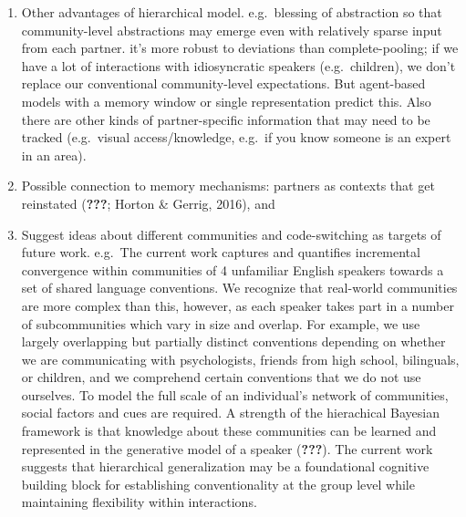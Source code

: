 \documentclass[10pt, letterpaper]{article}
\begin{document}
\begin{enumerate}
\def\labelenumi{\arabic{enumi}.}
\item
  Other advantages of hierarchical model. e.g.~blessing of abstraction
  so that community-level abstractions may emerge even with relatively
  sparse input from each partner. it's more robust to deviations than
  complete-pooling; if we have a lot of interactions with idiosyncratic
  speakers (e.g.~children), we don't replace our conventional
  community-level expectations. But agent-based models with a memory
  window or single representation predict this. Also there are other
  kinds of partner-specific information that may need to be tracked
  (e.g.~visual access/knowledge, e.g.~if you know someone is an expert
  in an area).
\item
  Possible connection to memory mechanisms: partners as contexts that
  get reinstated ({\textbf{???}}; Horton \& Gerrig, 2016), and
\item
  Suggest ideas about different communities and code-switching as
  targets of future work. e.g.~The current work captures and quantifies
  incremental convergence within communities of 4 unfamiliar English
  speakers towards a set of shared language conventions. We recognize
  that real-world communities are more complex than this, however, as
  each speaker takes part in a number of subcommunities which vary in
  size and overlap. For example, we use largely overlapping but
  partially distinct conventions depending on whether we are
  communicating with psychologists, friends from high school,
  bilinguals, or children, and we comprehend certain conventions that we
  do not use ourselves. To model the full scale of an individual's
  network of communities, social factors and cues are required. A
  strength of the hierachical Bayesian framework is that knowledge about
  these communities can be learned and represented in the generative
  model of a speaker ({\textbf{???}}). The current work suggests that
  hierarchical generalization may be a foundational cognitive building
  block for establishing conventionality at the group level while
  maintaining flexibility within interactions.
\end{enumerate}
\end{document}
